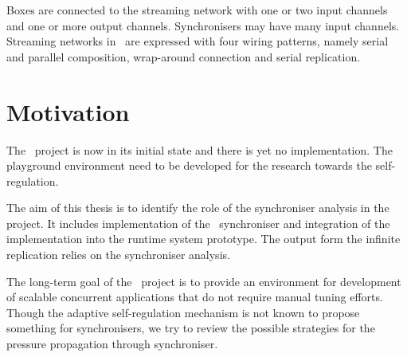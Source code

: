 Boxes are connected to the streaming network with one or two input channels and one or more output channels. Synchronisers may have many input channels. Streaming networks in \ak\ are expressed with four wiring patterns, namely serial and parallel composition, wrap-around connection and serial replication.


    \section{Motivation}
The \ak\ project is now in its initial state and there is yet no implementation. The playground environment need to be developed for the research towards the self-regulation.

The aim of this thesis is to identify the role of the synchroniser analysis in the project. It includes implementation of the \ak\ synchroniser and integration of the implementation into the runtime system prototype. The output form the infinite replication relies on the synchroniser analysis.

The long-term goal of the \ak\ project is to provide an environment for development of scalable concurrent applications that do not require manual tuning efforts. Though the adaptive self-regulation mechanism is not known to propose something for synchronisers, we try to review the possible strategies for the pressure propagation through synchroniser.




